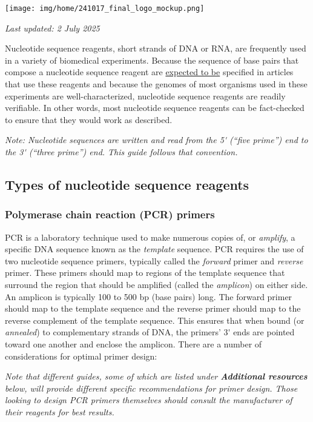\documentclass[letterpaper, 12pt]{article}
\begin{document}
\flushleft\texttt{[image: img/home/241017\_final\_logo\_mockup.png]}

\textit{Last updated: 2 July 2025}

Nucleotide sequence reagents, short strands of DNA or RNA, are frequently used in a variety of biomedical experiments. Because the sequence of base pairs that compose a nucleotide sequence reagent are \href{https://doi.org/10.1373/clinchem.2008.112797}{expected to be} specified in articles that use these reagents and because the genomes of most organisms used in these experiments are well-characterized, nucleotide sequence reagents are readily verifiable. In other words, most nucleotide sequence reagents can be fact-checked to ensure that they would work as described.

\textit{Note: Nucleotide sequences are written and read from the 5\'{} (``five prime'') end to the 3\'{} (``three prime'') end. This guide follows that convention.}

\subsection*{Types of nucleotide sequence reagents}

\subsubsection*{Polymerase chain reaction (PCR) primers}

PCR is a laboratory technique used to make numerous copies of, or \emph{amplify}, a specific DNA sequence known as the \emph{template} sequence. PCR requires the use of two nucleotide sequence primers, typically called the \emph{forward} primer and \emph{reverse} primer. These primers should map to regions of the template sequence that surround the region that should be amplified (called the \emph{amplicon}) on either side. An amplicon is typically 100 to 500 bp (base pairs) long. The forward primer should map to the template sequence and the reverse primer should map to the reverse complement of the template sequence. This ensures that when bound (or \emph{annealed}) to complementary strands of DNA, the primers' 3\'{} ends are pointed toward one another and enclose the amplicon. There are a number of considerations for optimal primer design:

\textit{Note that different guides, some of which are listed under \textbf{Additional resources} below, will provide different specific recommendations for primer design. Those looking to design PCR primers themselves should consult the manufacturer of their reagents for best results.}
\end{document}
